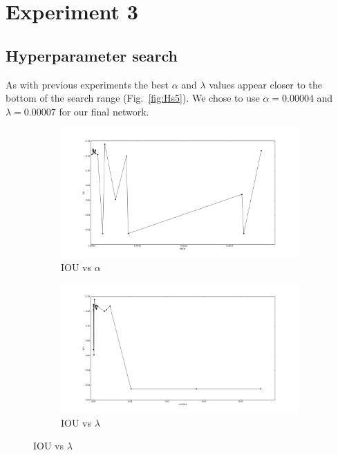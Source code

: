 \section{Experiment 3}
\subsection{Hyperparameter search}
As with previous experiments the best $\alpha$ and $\lambda$ values appear closer to the bottom of the search range (Fig.~\ref{fig:Hs5}). We chose to use $\alpha = 0.00004$ and $\lambda = 0.00007$ for our final network.
\begin{figure}[h]
	\centering
	\begin{subfigure}{0.32\textwidth}
		\centering
                \includegraphics[width=\textwidth]{plots/hs5_alpha.png}
         \caption{IOU vs $\alpha$}
	\end{subfigure}
	\begin{subfigure}{0.32\textwidth}
		\centering
                \includegraphics[width=\textwidth]{plots/hs5_lambda.png}
         \caption{IOU vs $\lambda$}
	\end{subfigure}

\end{figure}
